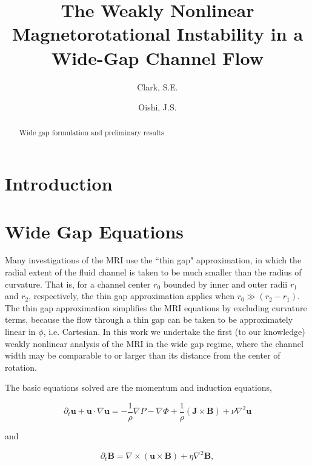 \documentclass[onecolumn]{emulateapj}
\newcommand{\beq}{\begin{equation}}
\newcommand{\eeq}{\end{equation}}
\begin{document}
\title{The Weakly Nonlinear Magnetorotational Instability in a Wide-Gap Channel Flow}
\author{Clark, S.E.}
\author{Oishi, J.S. }


\begin{abstract}
Wide gap formulation and preliminary results
\end{abstract}

\section{Introduction}

\section{Wide Gap Equations}

Many investigations of the MRI use the ``thin gap" approximation, in which the radial extent of the fluid channel is taken to be much smaller than the radius of curvature. That is, for a channel center $r_0$ bounded by inner and outer radii $r_1$ and $r_2$, respectively, the thin gap approximation applies when $r_0 \gg (r_2 - r_1)$. The thin gap approximation simplifies the MRI equations by excluding curvature terms, because the flow through a thin gap can be taken to be approximately linear in $\phi$, i.e. Cartesian. In this work we undertake the first (to our knowledge) weakly nonlinear analysis of the MRI in the wide gap regime, where the channel width may be comparable to or larger than its distance from the center of rotation.

The basic equations solved are the momentum and induction equations,

\beq\label{momentum}
\partial_t \mathbf{u} + \mathbf{u} \cdot \nabla \mathbf{u} = -\frac{1}{\rho}\nabla P - \nabla\Phi + \frac{1}{\rho} \left(\mathbf{J}\times\mathbf{B}\right) + \nu\nabla^2 \mathbf{u} 
\eeq

and

\beq\label{induction}
\partial_t \mathbf{B} = \nabla \times \left(\mathbf{u} \times \mathbf{B}\right) + \eta\nabla^2\mathbf{B},
\eeq
\end{document}
